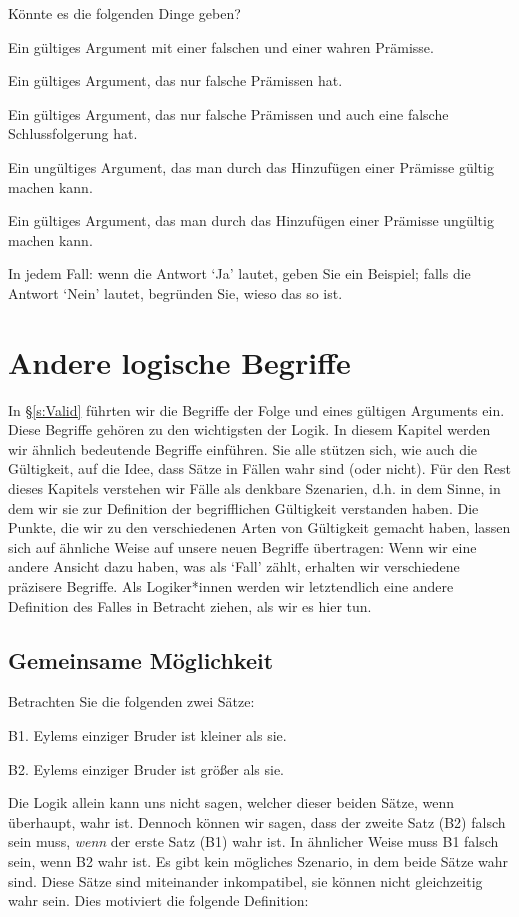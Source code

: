 \problempart
\label{pr.EnglishCombinations}
Könnte es die folgenden Dinge geben?
	\begin{earg}
		\item Ein gültiges Argument mit einer falschen und einer wahren Prämisse.
		\item Ein gültiges Argument, das nur falsche Prämissen hat.
		\item Ein gültiges Argument, das nur falsche Prämissen und auch eine falsche Schlussfolgerung hat.
		\item Ein ungültiges Argument, das man durch das Hinzufügen einer Prämisse gültig machen kann.
		\item Ein gültiges Argument, das man durch das Hinzufügen einer Prämisse ungültig machen kann.
	\end{earg}
In jedem Fall: wenn die Antwort `Ja' lautet, geben Sie ein Beispiel; falls die Antwort `Nein' lautet, begründen Sie, wieso das so ist.

\chapter{Andere logische Begriffe}\label{s:BasicNotions}

In \S\ref{s:Valid} führten wir die Begriffe der Folge und eines gültigen Arguments ein. Diese Begriffe gehören zu den wichtigsten der Logik. In diesem Kapitel werden wir ähnlich bedeutende Begriffe einführen. Sie alle stützen sich, wie auch die Gültigkeit, auf die Idee, dass Sätze in Fällen wahr sind (oder nicht). Für den Rest dieses Kapitels verstehen wir Fälle als denkbare Szenarien, d.h. in dem Sinne, in dem wir sie zur Definition der begrifflichen Gültigkeit verstanden haben. Die Punkte, die wir zu den verschiedenen Arten von Gültigkeit gemacht haben, lassen sich auf ähnliche Weise auf unsere neuen Begriffe übertragen: Wenn wir eine andere Ansicht dazu haben, was als `Fall' zählt, erhalten wir verschiedene präzisere Begriffe. Als Logiker*innen werden wir letztendlich eine andere Definition des Falles in Betracht ziehen, als wir es hier tun.  

\section{Gemeinsame Möglichkeit}

Betrachten Sie die folgenden zwei Sätze:
	\begin{ebullet}
		\item[B1.] Eylems einziger Bruder ist kleiner als sie.
		\item[B2.] Eylems einziger Bruder ist grö{\ss}er als sie.
	\end{ebullet}
Die Logik allein kann uns nicht sagen, welcher dieser beiden Sätze, wenn überhaupt, wahr ist. Dennoch können wir sagen, dass der zweite Satz (B2) falsch sein muss, \emph{wenn} der erste Satz (B1) wahr ist. In ähnlicher Weise muss B1 falsch sein, wenn B2 wahr ist. Es gibt kein mögliches Szenario, in dem beide Sätze wahr sind. Diese Sätze sind miteinander inkompatibel, sie können nicht gleichzeitig wahr sein. Dies motiviert die folgende Definition:

